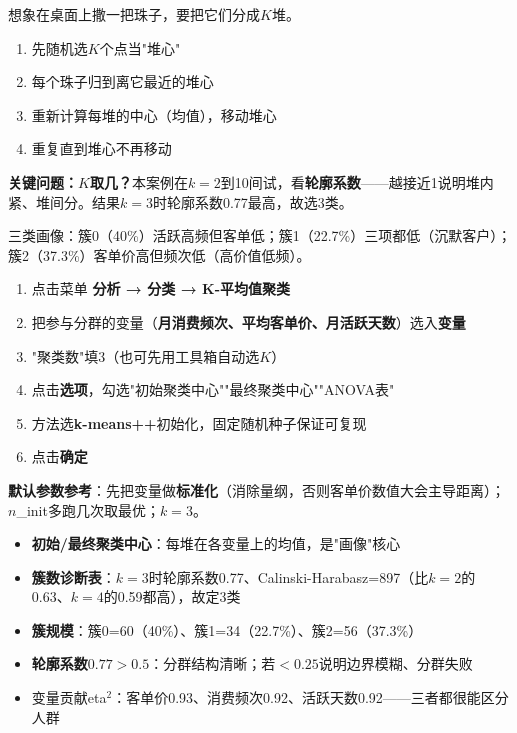 \begin{algoprinciple}
想象在桌面上撒一把珠子，要把它们分成$K$堆。
\begin{enumerate}
    \item 先随机选$K$个点当"堆心"
    \item 每个珠子归到离它最近的堆心
    \item 重新计算每堆的中心（均值），移动堆心
    \item 重复直到堆心不再移动
\end{enumerate}

\textbf{关键问题：$K$取几？}本案例在$k=2$到10间试，看\textbf{轮廓系数}——越接近1说明堆内紧、堆间分。结果$k=3$时轮廓系数0.77最高，故选3类。

三类画像：簇0（40\%）活跃高频但客单低；簇1（22.7\%）三项都低（沉默客户）；簇2（37.3\%）客单价高但频次低（高价值低频）。
\end{algoprinciple}

\begin{algosposs}
\begin{enumerate}
    \item 点击菜单 \textbf{分析 → 分类 → K-平均值聚类}
    \item 把参与分群的变量（\textbf{月消费频次、平均客单价、月活跃天数}）选入\textbf{变量}
    \item "聚类数"填3（也可先用工具箱自动选$K$）
    \item 点击\textbf{选项}，勾选"初始聚类中心""最终聚类中心""ANOVA表"
    \item 方法选\textbf{k-means++}初始化，固定随机种子保证可复现
    \item 点击\textbf{确定}
\end{enumerate}

\textbf{默认参数参考}：先把变量做\textbf{标准化}（消除量纲，否则客单价数值大会主导距离）；$n$\_init多跑几次取最优；$k=3$。
\end{algosposs}

\begin{algoresult}
\begin{itemize}
    \item \textbf{初始/最终聚类中心}：每堆在各变量上的均值，是"画像"核心
    \item \textbf{簇数诊断表}：$k=3$时轮廓系数0.77、Calinski-Harabasz=897（比$k=2$的0.63、$k=4$的0.59都高），故定3类
    \item \textbf{簇规模}：簇0=60（40\%）、簇1=34（22.7\%）、簇2=56（37.3\%）
    \item \textbf{轮廓系数}$0.77>0.5$：分群结构清晰；若$<0.25$说明边界模糊、分群失败
    \item 变量贡献eta$^2$：客单价0.93、消费频次0.92、活跃天数0.92——三者都很能区分人群
\end{itemize}
\end{algoresult}

